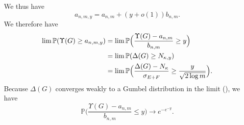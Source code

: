 \documentclass[10pt,journal,compsoc]{IEEEtran}
\theoremstyle{definition}
\begin{document}
\begin{IEEEproof}[Lemma~8]
We thus have
\begin{equation*}
   a_{n,m,y} = a_{n,m} + (y + o(1)) b_{n,m}.
\end{equation*}
We therefore have
\begin{equation*}
  \begin{split}
  \lim \mathbb{P}(\Upsilon(G) \geq a_{n,m,y}) &= 
  \lim \mathbb{P}\Bigl(\frac{\Upsilon(G) - a_{n,m}}{b_{n,m}} \geq y \Bigr) \\
  &= \lim \mathbb{P}(\Delta(G) \geq N_{\kappa,y}) \\
  &= \lim \mathbb{P}\Bigl(\frac{\Delta(G) -
    N_{\kappa}}{\sigma_{E+F}} \geq \frac{y}{\sqrt{2 \log{m}}} \Bigr). \\
  \end{split}
\end{equation*}
Because $\Delta(G)$ converges weakly to a Gumbel
distribution in the limit
(\cite{bollobas85:_random_graph,rukhin:_limit_distr_graph_scan_statis}),
we have
\begin{equation}
  \label{eq:47}
  \mathbb{P}\Big(\frac{\Upsilon(G) - a_{n,m}}{b_{n,m}} \leq
    y\Bigr) \rightarrow e^{- e^{-y}}.
\end{equation}
\end{IEEEproof}

\end{document}
